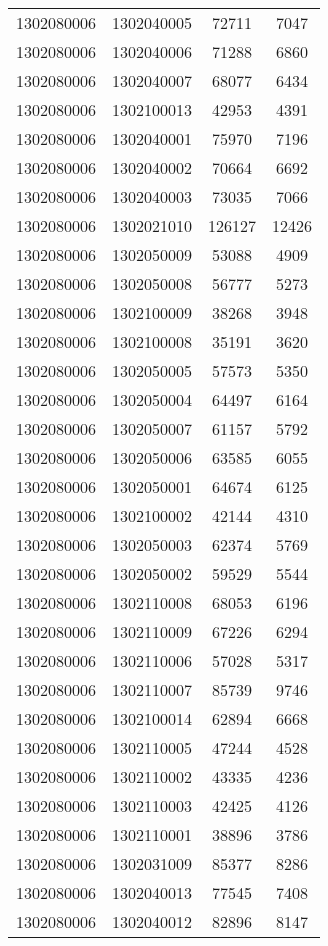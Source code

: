 \begin{longtable}[h]{llcc}
		1302080006 & 1302040005 & 72711 & 7047\\
		1302080006 & 1302040006 & 71288 & 6860\\
		1302080006 & 1302040007 & 68077 & 6434\\
		1302080006 & 1302100013 & 42953 & 4391\\
		1302080006 & 1302040001 & 75970 & 7196\\
		1302080006 & 1302040002 & 70664 & 6692\\
		1302080006 & 1302040003 & 73035 & 7066\\
		1302080006 & 1302021010 & 126127 & 12426\\
		1302080006 & 1302050009 & 53088 & 4909\\
		1302080006 & 1302050008 & 56777 & 5273\\
		1302080006 & 1302100009 & 38268 & 3948\\
		1302080006 & 1302100008 & 35191 & 3620\\
		1302080006 & 1302050005 & 57573 & 5350\\
		1302080006 & 1302050004 & 64497 & 6164\\
		1302080006 & 1302050007 & 61157 & 5792\\
		1302080006 & 1302050006 & 63585 & 6055\\
		1302080006 & 1302050001 & 64674 & 6125\\
		1302080006 & 1302100002 & 42144 & 4310\\
		1302080006 & 1302050003 & 62374 & 5769\\
		1302080006 & 1302050002 & 59529 & 5544\\
		1302080006 & 1302110008 & 68053 & 6196\\
		1302080006 & 1302110009 & 67226 & 6294\\
		1302080006 & 1302110006 & 57028 & 5317\\
		1302080006 & 1302110007 & 85739 & 9746\\
		1302080006 & 1302100014 & 62894 & 6668\\
		1302080006 & 1302110005 & 47244 & 4528\\
		1302080006 & 1302110002 & 43335 & 4236\\
		1302080006 & 1302110003 & 42425 & 4126\\
		1302080006 & 1302110001 & 38896 & 3786\\
		1302080006 & 1302031009 & 85377 & 8286\\
		1302080006 & 1302040013 & 77545 & 7408\\
		1302080006 & 1302040012 & 82896 & 8147\\

\end{longtable}
